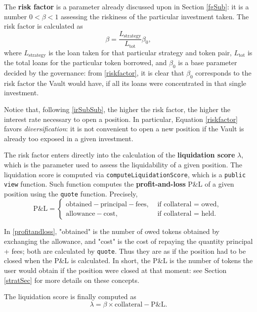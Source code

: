 \documentclass[a4paper,10 pt]{article}
\theoremstyle{definition}
\begin{document}
The {\bf risk factor} is a parameter already discussed upon in Section \ref{fgSub}: it is a number $0 < \beta < 1$ assessing the riskiness of the particular investment taken. The risk factor is calculated as
\begin{equation}\label{riskfactor}
\beta = \frac{L_{\text{strategy}}}{L_{\text{tot}}}\beta_0,
\end{equation}
where $L_{\text{strategy}}$ is the loan taken for that particular strategy and token pair, $L_{\text{tot}}$ is the total loans for the particular token borrowed, and $\beta_0$ is a base parameter decided by the governance: from \eqref{riskfactor}, it is clear that $\beta_0$ corresponds to the risk factor the Vault would have, if all its loans were concentrated in that single investment.

Notice that, following \ref{irSubSub}, the higher the risk factor, the higher the interest rate necessary to open a position. In particular, Equation \eqref{riskfactor} favors {\it diversification}: it is not convenient to open a new position if the Vault is already too exposed in a given investment.

The risk factor enters directly into the calculation of the {\bf liquidation score} $\lambda$, which is the parameter used to assess the liquidability of a given position. The liquidation score is computed via \verb|computeLiquidationScore|, which is a \verb|public view| function. Such function computes the {\bf profit-and-loss} P\&L of a given position using the \verb|quote| function. Precisely,
\begin{equation}\label{profitandloss}
\text{P\&L} = \begin{cases}
\text{obtained} - \text{principal} - \text{fees}, & \text{ if collateral } = \text{ owed, } \\
\text{allowance} - \text{cost}, & \text{ if collateral } = \text{ held. }
\end{cases} 
\end{equation}

In \eqref{profitandloss}, "obtained" is the number of owed tokens obtained by exchanging the allowance, and "cost" is the cost of repaying the quantity principal + fees; both are calculated by \verb|quote|. Thus they are as if the position had to be closed when the P\&L is calculated. In short, the P\&L is the number of tokens the user would obtain if the position were closed at that moment: see Section \ref{stratSec} for more details on these concepts.

The liquidation score is finally computed as
\begin{equation}\label{liquidationscore}
\lambda = \beta \times \text{collateral} - \text{P\&L}.
\end{equation}
\end{document}
